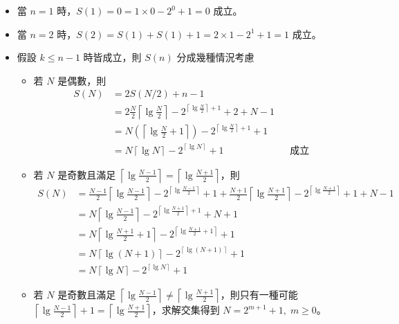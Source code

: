 \documentclass[11pt]{article}
\begin{document}
\begin{itemize}
	\item 當 $n = 1$ 時，$S(1) = 0 = 1 \times 0 - 2^0 +1 = 0$ 成立。
	\item 當 $n = 2$ 時，$S(2) = S(1) + S(1) + 1 = 2 \times 1 - 2^1 +1 = 1$ 成立。
	\item 假設 $k \le n-1$ 時皆成立，則 $S(n)$ 分成幾種情況考慮
		\begin{itemize}
			\item 若 $N$ 是偶數，則 
				\begin{align*}
			S(N) &= 2S(N/2) + n-1 \\
			&= 2 \frac{N}{2} \left \lceil \lg \frac{N}{2} \right \rceil - 2^{\left \lceil \lg \frac{N}{2} \right \rceil + 1} + 2 + N - 1 \\
			&= N (\left \lceil \lg \frac{N}{2} + 1 \right \rceil) - 2^{\left \lceil \lg \frac{N}{2} \right \rceil + 1} + 1 \\
			&= N \left \lceil \lg N \right \rceil - 2^{\left \lceil \lg N \right \rceil} + 1
				&& \text{成立}
				\end{align*}
			\item 若 $N$ 是奇數且滿足 
				$\left \lceil \lg \frac{N-1}{2} \right \rceil = \left \lceil \lg \frac{N+1}{2} \right \rceil$，則 
				\begin{align*}
			S(N) &= \frac{N-1}{2} \left \lceil \lg \frac{N-1}{2} \right \rceil - 2^{\left \lceil \lg \frac{N-1}{2} \right \rceil} + 1 +
			\frac{N+1}{2} \left \lceil \lg \frac{N+1}{2} \right \rceil - 2^{\left \lceil \lg \frac{N+1}{2} \right \rceil} + 1 + N-1 \\
				&= N \left \lceil \lg \frac{N-1}{2} \right \rceil - 2^{\left \lceil \lg \frac{N+1}{2} \right \rceil + 1} + N+1 \\
				&= N \left \lceil \lg \frac{N+1}{2} + 1\right \rceil - 2^{\left \lceil \lg \frac{N+1}{2} + 1\right \rceil} + 1 \\
				&= N \left \lceil \lg (N+1) \right \rceil - 2^{\left \lceil \lg (N+1) \right \rceil} + 1 \\
				&= N \left \lceil \lg N \right \rceil - 2^{\left \lceil \lg N \right \rceil} + 1
				\end{align*}
			\item 若 $N$ 是奇數且滿足 
				$\left \lceil \lg \frac{N-1}{2} \right \rceil \neq \left \lceil \lg \frac{N+1}{2} \right \rceil$，則只有一種可能 $\left \lceil \lg \frac{N-1}{2} \right \rceil +1 = \left \lceil \lg \frac{N+1}{2} \right \rceil$，求解交集得到 $N=2^{m+1}+1, \; m \ge 0$。
				\begin{itemize}

\end{itemize}
\end{itemize}
\end{itemize}
\end{document}
